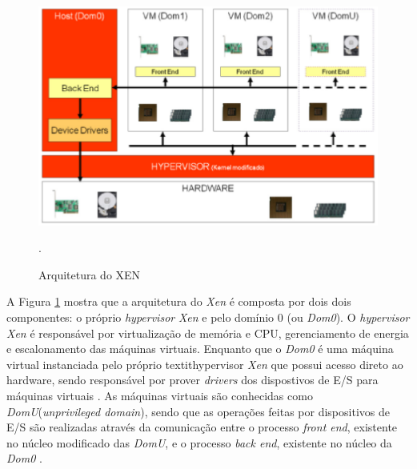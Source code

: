 \begin{figure}[!htb]
\centering
\includegraphics [keepaspectratio=true,scale=0.65]{figuras/xen_arquitecture.eps}
\caption{Arquitetura do XEN}
\cite{fabiano}.
\label{xen_arquitecture}
\end{figure}

A Figura \ref{xen_arquitecture} mostra que a arquitetura do \textit{Xen} é composta por dois dois componentes: o próprio \textit{hypervisor} \textit{Xen} e pelo domínio 0 (ou \textit{Dom0}). O \textit{hypervisor} \textit{Xen} é responsável por virtualização de memória e CPU, gerenciamento de energia e escalonamento das máquinas virtuais. Enquanto que o \textit{Dom0} é uma máquina virtual instanciada pelo próprio textit{hypervisor} \textit{Xen} que possui acesso direto ao hardware, sendo responsável por prover \textit{drivers} dos dispostivos de E/S para máquinas virtuais \cite{redhatkvm}. As máquinas virtuais são conhecidas como \textit{DomU}(\textit{unprivileged domain}), sendo que as operações feitas por dispositivos de E/S são realizadas através da comunicação entre o processo \textit{front end}, existente no núcleo modificado das \textit{DomU}, e o processo \textit{back end}, existente no núcleo da \textit{Dom0} \cite{redhatkvm}.



